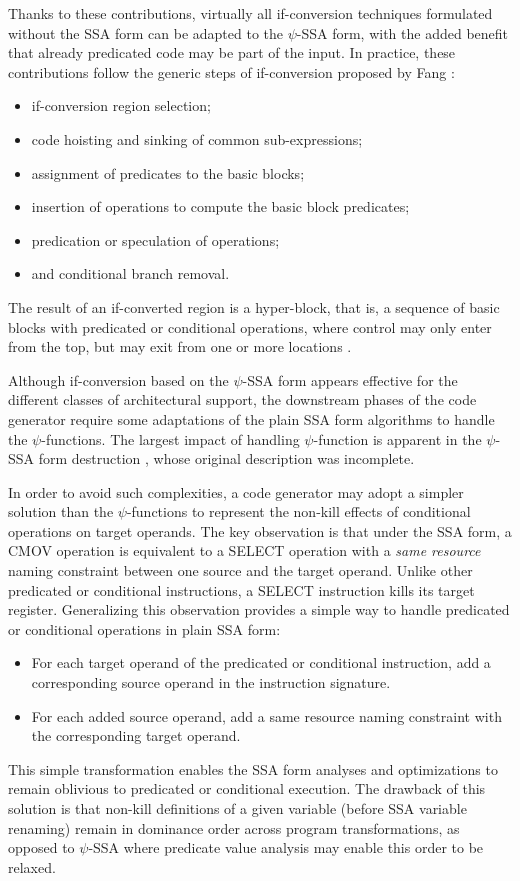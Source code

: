 Thanks to these contributions, virtually all if-conversion techniques formulated
without the SSA form can be adapted to the $\psi$-SSA form, with the added
benefit that already predicated code may be part of the input. In practice, these
contributions follow the generic steps of if-conversion proposed by Fang
\cite{Fang:1996:LCPC}:
\begin{itemize}
\item if-conversion region selection;
\item code hoisting and sinking of common sub-expressions;
\item assignment of predicates to the basic blocks;
\item insertion of operations to compute the basic block predicates;
\item predication or speculation of operations;
\item and conditional branch removal.
\end{itemize}
The result of an if-converted region is a hyper-block, that is, a sequence of
basic blocks with predicated or conditional operations, where control may only
enter from the top, but may exit from one or more locations
\cite{Mahlke:1992:MICRO}.

\medskip
Although if-conversion based on the $\psi$-SSA form appears effective for the
different classes of architectural support, the downstream phases of the code
generator require some adaptations of the plain SSA form algorithms to
handle the $\psi$-functions. The largest impact of handling $\psi$-function is
apparent in the $\psi$-SSA form destruction \cite{Ferriere:2007:SCOPES}, whose
original description \cite{Stoutchinin:2001:MICRO} was incomplete.

In order to avoid such complexities, a code generator may adopt a simpler solution than
the $\psi$-functions to represent the non-kill effects of
conditional operations on target operands. The key observation is that under the SSA form,
a CMOV operation is equivalent to a SELECT
operation with a \emph{same resource} naming constraint between one source and the
target operand. Unlike other predicated or conditional instructions, a SELECT
instruction kills its target register.  Generalizing this observation provides a
simple way to handle predicated or conditional operations in plain SSA form:
\begin{itemize}

\item For each target operand of the predicated or conditional instruction, add
a corresponding source operand in the instruction signature.

\item For each added source operand, add a {same resource} naming constraint
with the corresponding target operand.

\end{itemize}
This simple transformation enables the SSA form analyses and optimizations to
remain oblivious to predicated or conditional execution. The drawback of this
solution is that non-kill definitions of a given variable (before SSA variable
renaming) remain in dominance order across program transformations, as opposed
to $\psi$-SSA where predicate value analysis may enable this order to be relaxed.

